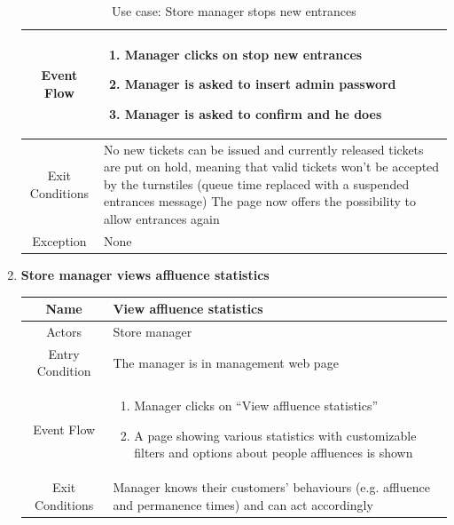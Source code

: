 \begin{enumerate}
\begin{table}[H]
{\begin{tabular}{|c|p{14cm}|}
			Event Flow & \begin{enumerate}
				\item Manager clicks on stop new entrances
				\item Manager is asked to insert admin password
				\item Manager is asked to confirm and he does
				
			\end{enumerate}\\
			
			\hline
			Exit Conditions & No new tickets can be issued and currently released tickets are put on hold, meaning that valid tickets won’t be accepted by the turnstiles (queue time replaced with a suspended entrances message)
			The page now offers the possibility to allow entrances again\\
			\hline
			
			Exception & None\\
			
			\hline
		\end{tabular}
	}
	\label{tab:UCManStop}
	\caption{Use case: Store manager stops new entrances}
\end{table}

\item \textbf{Store manager views affluence statistics}

\begin{table}[H]
	{
		\begin{tabular}{|c|p{14cm}|}
			\hline
			Name & View affluence statistics\\
			\hline
			Actors & Store manager\\
			\hline
			Entry Condition & The manager is in management web page\\
			\hline
			
			Event Flow & \begin{enumerate}
				\item Manager clicks on “View affluence statistics”
				\item A page showing various statistics with customizable filters and options about people affluences is shown
				
			\end{enumerate}\\
			
			\hline
			Exit Conditions & Manager knows their customers’ behaviours (e.g. affluence and permanence times) and can act accordingly\\
			\hline
			

\end{tabular}}
\end{table}
\end{enumerate}
